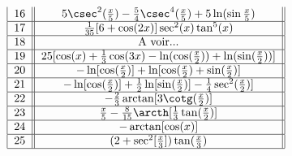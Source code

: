 \[\begin{tabular}{| c || c ||  }
              $16$  &  $5\csec^2(\frac{x}{5})-\frac{5}{4}\csec^4( \frac{x}{5})+5\ln(\sin \frac{x}{5})$			                                                               \\ \hline   
              $17$  & $\frac{1}{35}[6+\cos(2x)]\sec^2(x)\tan^5(x)$		                                                               \\ \hline   
              $18$  &  A voir...                                                               \\ \hline   
              $19$  &  $25[\cos(x)+\frac{1}{3}\cos(3x)-\ln(\cos(\frac{x}{2}))+\ln(\sin(\frac{x}{2}))]$			                                                               \\ \hline   
              $20$  & $-\ln[\cos(\frac{x}{2} )]+\ln[\cos(\frac{x}{2})+\sin(\frac{x}{2})]$                                                          \\ \hline   
              $21$  &  $-\ln[\cos(\frac{x}{2} )]+\frac{1}{2} \ln[\sin(\frac{x}{2})]-\frac{1}{4} \sec^2(\frac{x}{2})]$			                                                               \\ \hline   
              $22$  &  $-\frac{2}{3}\arctan[3\cotg(\frac{x}{2})]$			                                                               \\ \hline   
              $23$  &  $\frac{x}{5}-\frac{8}{15}\arcth[\frac{1}{3}\tan(\frac{x}{2})]$			                                                               \\ \hline   
              $24$  &  $-\arctan[\cos(x)]$			                                                               \\ \hline   
              $25$  &  $(2+\sec^2[\frac{x}{3}])\tan(\frac{x}{3})$			                                                               \\ \hline   

\end{tabular} \]


